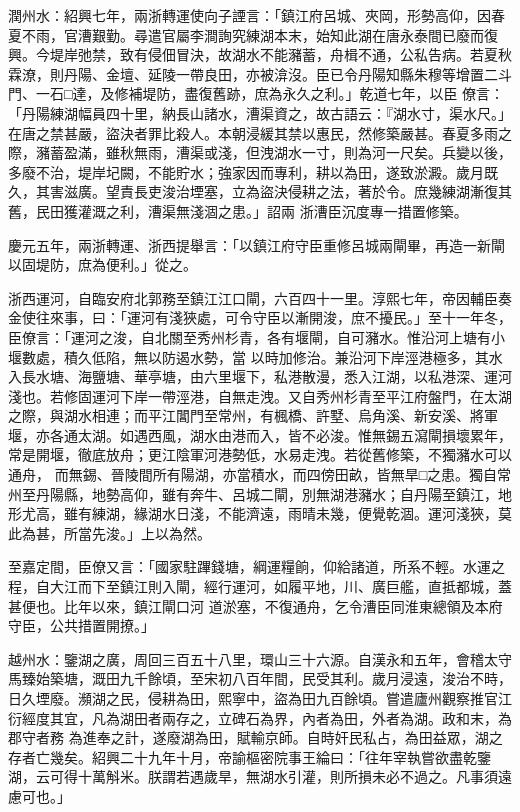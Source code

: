 \begin{pinyinscope}
 潤州水：紹興七年，兩浙轉運使向子諲言：「鎮江府呂城、夾岡，形勢高仰，因春夏不雨，官漕艱勤。尋遣官屬李澗詢究練湖本末，始知此湖在唐永泰間已廢而復興。今堤岸弛禁，致有侵佃冒決，故湖水不能瀦蓄，舟楫不通，公私告病。若夏秋霖潦，則丹陽、金壇、延陵一帶良田，亦被渰沒。臣已令丹陽知縣朱穆等增置二斗門、一石□達，及修補堤防，盡復舊跡，庶為永久之利。」乾道七年，以臣
 僚言：「丹陽練湖幅員四十里，納長山諸水，漕渠資之，故古語云：『湖水寸，渠水尺。」在唐之禁甚嚴，盜決者罪比殺人。本朝浸緩其禁以惠民，然修築嚴甚。春夏多雨之際，瀦蓄盈滿，雖秋無雨，漕渠或淺，但洩湖水一寸，則為河一尺矣。兵變以後，多廢不治，堤岸圮闕，不能貯水；強家因而專利，耕以為田，遂致淤澱。歲月既久，其害滋廣。望責長吏浚治堙塞，立為盜決侵耕之法，著於令。庶幾練湖漸復其舊，民田獲灌溉之利，漕渠無淺涸之患。」詔兩
 浙漕臣沉度專一措置修築。



 慶元五年，兩浙轉運、浙西提舉言：「以鎮江府守臣重修呂城兩閘畢，再造一新閘以固堤防，庶為便利。」從之。



 浙西運河，自臨安府北郭務至鎮江江口閘，六百四十一里。淳熙七年，帝因輔臣奏金使往來事，曰：「運河有淺狹處，可令守臣以漸開浚，庶不擾民。」至十一年冬，臣僚言：「運河之浚，自北關至秀州杉青，各有堰閘，自可瀦水。惟沿河上塘有小堰數處，積久低陷，無以防遏水勢，當
 以時加修治。兼沿河下岸涇港極多，其水入長水塘、海鹽塘、華亭塘，由六里堰下，私港散漫，悉入江湖，以私港深、運河淺也。若修固運河下岸一帶涇港，自無走洩。又自秀州杉青至平江府盤門，在太湖之際，與湖水相連；而平江閶門至常州，有楓橋、許墅、烏角溪、新安溪、將軍堰，亦各通太湖。如遇西風，湖水由港而入，皆不必浚。惟無錫五瀉閘損壞累年，常是開堰，徹底放舟；更江陰軍河港勢低，水易走洩。若從舊修築，不獨瀦水可以通舟，
 而無錫、晉陵間所有陽湖，亦當積水，而四傍田畝，皆無旱□之患。獨自常州至丹陽縣，地勢高仰，雖有奔牛、呂城二閘，別無湖港瀦水；自丹陽至鎮江，地形尤高，雖有練湖，緣湖水日淺，不能濟遠，雨晴未幾，便覺乾涸。運河淺狹，莫此為甚，所當先浚。」上以為然。



 至嘉定間，臣僚又言：「國家駐蹕錢塘，綱運糧餉，仰給諸道，所系不輕。水運之程，自大江而下至鎮江則入閘，經行運河，如履平地，川、廣巨艦，直抵都城，蓋甚便也。比年以來，鎮江閘口河
 道淤塞，不復通舟，乞令漕臣同淮東總領及本府守臣，公共措置開撩。」



 越州水：鑒湖之廣，周回三百五十八里，環山三十六源。自漢永和五年，會稽太守馬臻始築塘，溉田九千餘頃，至宋初八百年間，民受其利。歲月浸遠，浚治不時，日久堙廢。瀕湖之民，侵耕為田，熙寧中，盜為田九百餘頃。嘗遣廬州觀察推官江衍經度其宜，凡為湖田者兩存之，立碑石為界，內者為田，外者為湖。政和末，為郡守者務
 為進奉之計，遂廢湖為田，賦輸京師。自時奸民私占，為田益眾，湖之存者亡幾矣。紹興二十九年十月，帝諭樞密院事王綸曰：「往年宰執嘗欲盡乾鑒湖，云可得十萬斛米。朕謂若遇歲旱，無湖水引灌，則所損未必不過之。凡事須遠慮可也。」




\end{pinyinscope}
